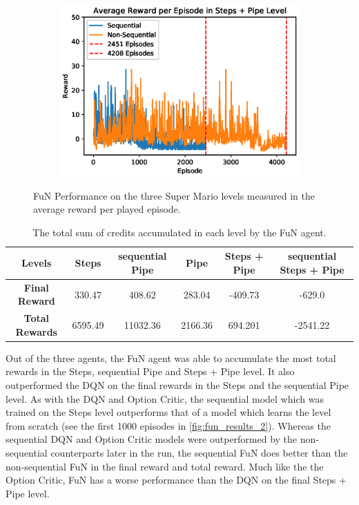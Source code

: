 \documentclass[notitlepage,a4paper,11pt]{article}
\begin{document}
\begin{figure}[htb!]
\begin{subfigure}[t]{0.32\textwidth}
         \includegraphics[width=\textwidth]{figs/fun_results_3.eps}
         \caption{}
         \label{fig:fun_results_3}
     \end{subfigure}
        \caption{FuN Performance on the three Super Mario levels measured in the average reward per played episode.}
        \label{fig:fun_results}
        
\end{figure}

\begin{table}[htb!]
\centering
\begin{tabular}{ |c|c|c|c|c|c| } 
	\hline
	\textbf{Levels} & Steps & sequential Pipe  & Pipe & Steps + Pipe & sequential Steps + Pipe \\
	\hline
	\textbf{Final Reward} & 330.47 & 408.62 & 283.04 & -409.73 & -629.0 \\
	\hline
	\textbf{Total Rewards} & 6595.49 & 11032.36 & 2166.36 & 694.201 & -2541.22 \\
	\hline
\end{tabular}
\caption{The total sum of credits accumulated in each level by the FuN agent.}


\end{table}

Out of the three agents, the FuN agent was able to accumulate the most total rewards in the Steps, sequential Pipe and Steps + Pipe level. It also outperformed the DQN on the final rewards in the Steps and the sequential Pipe level. As with the DQN and Option Critic, the sequential model which was trained on the Steps level outperforms that of a model which learns the level from scratch (see the first 1000 episodes in \ref{fig:fun_results_2}). Whereas the sequential DQN and Option Critic models were outperformed by the non-sequential counterparts later in the run, the sequential FuN does better than the non-sequential FuN in the final reward and total reward. Much like the the Option Critic, FuN has a worse performance than the DQN on the final Steps + Pipe level. 
\end{document}
